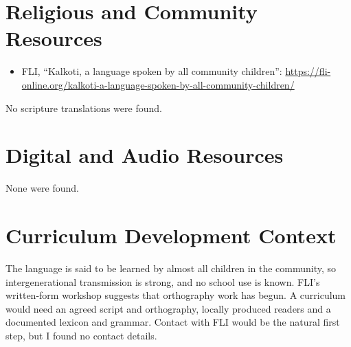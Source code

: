 \documentclass[12pt]{article}
\begin{document}
\section{Religious and Community Resources}
\begin{itemize}
\item FLI, ``Kalkoti, a language spoken by all community children'': \url{https://fli-online.org/kalkoti-a-language-spoken-by-all-community-children/}
\end{itemize}
No scripture translations were found.

\section{Digital and Audio Resources}
None were found.

\section{Curriculum Development Context}
The language is said to be learned by almost all children in the community, so intergenerational transmission is strong, and no school use is known. FLI's written-form workshop suggests that orthography work has begun. A curriculum would need an agreed script and orthography, locally produced readers and a documented lexicon and grammar. Contact with FLI would be the natural first step, but I found no contact details.
\end{document}
